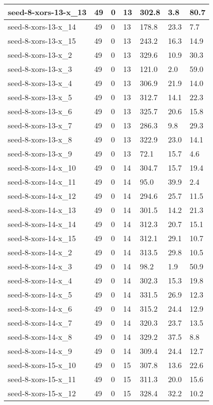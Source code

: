 \begin{scriptsize}
\begin{longtable}{|p{5cm}|l|l|l|l|l|l|}
seed-8-xors-13-x\_13&49&0&13&302.8&3.8&80.7 \\ \hline 
seed-8-xors-13-x\_14&49&0&13&178.8&23.3&7.7 \\ \hline 
seed-8-xors-13-x\_15&49&0&13&243.2&16.3&14.9 \\ \hline 
seed-8-xors-13-x\_2&49&0&13&329.6&10.9&30.3 \\ \hline 
seed-8-xors-13-x\_3&49&0&13&121.0&2.0&59.0 \\ \hline 
seed-8-xors-13-x\_4&49&0&13&306.9&21.9&14.0 \\ \hline 
seed-8-xors-13-x\_5&49&0&13&312.7&14.1&22.3 \\ \hline 
seed-8-xors-13-x\_6&49&0&13&325.7&20.6&15.8 \\ \hline 
seed-8-xors-13-x\_7&49&0&13&286.3&9.8&29.3 \\ \hline 
seed-8-xors-13-x\_8&49&0&13&322.9&23.0&14.1 \\ \hline 
seed-8-xors-13-x\_9&49&0&13&72.1&15.7&4.6 \\ \hline 
seed-8-xors-14-x\_10&49&0&14&304.7&15.7&19.4 \\ \hline 
seed-8-xors-14-x\_11&49&0&14&95.0&39.9&2.4 \\ \hline 
seed-8-xors-14-x\_12&49&0&14&294.6&25.7&11.5 \\ \hline 
seed-8-xors-14-x\_13&49&0&14&301.5&14.2&21.3 \\ \hline 
seed-8-xors-14-x\_14&49&0&14&312.3&20.7&15.1 \\ \hline 
seed-8-xors-14-x\_15&49&0&14&312.1&29.1&10.7 \\ \hline 
seed-8-xors-14-x\_2&49&0&14&313.5&29.8&10.5 \\ \hline 
seed-8-xors-14-x\_3&49&0&14&98.2&1.9&50.9 \\ \hline 
seed-8-xors-14-x\_4&49&0&14&302.3&15.3&19.8 \\ \hline 
seed-8-xors-14-x\_5&49&0&14&331.5&26.9&12.3 \\ \hline 
seed-8-xors-14-x\_6&49&0&14&315.2&24.4&12.9 \\ \hline 
seed-8-xors-14-x\_7&49&0&14&320.3&23.7&13.5 \\ \hline 
seed-8-xors-14-x\_8&49&0&14&329.2&37.5&8.8 \\ \hline 
seed-8-xors-14-x\_9&49&0&14&309.4&24.4&12.7 \\ \hline 
seed-8-xors-15-x\_10&49&0&15&307.8&13.6&22.6 \\ \hline 
seed-8-xors-15-x\_11&49&0&15&311.3&20.0&15.6 \\ \hline 
seed-8-xors-15-x\_12&49&0&15&328.4&32.2&10.2 \\ \hline 

\end{longtable}
\end{scriptsize}
